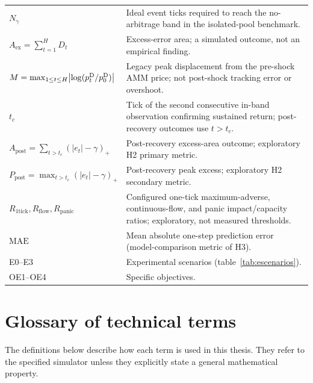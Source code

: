 \begin{center}
\begin{tabularx}{\textwidth}{@{}l X@{}}
$N_\gamma$ & Ideal event ticks required to reach the no-arbitrage band in the isolated-pool benchmark. \\
$A_{\mathrm{ex}} = \sum_{t=1}^{H} D_t$ & Excess-error area; a simulated outcome, not an empirical finding. \\
$M = \max_{1\le t\le H}\bigl|\log(p^{\mathrm{D}}_t/p^{\mathrm{D}}_0)\bigr|$ & Legacy peak displacement from the pre-shock AMM price; not post-shock tracking error or overshoot. \\
$t_c$ & Tick of the second consecutive in-band observation confirming sustained return; post-recovery outcomes use $t>t_c$. \\
$A_{\mathrm{post}}=\sum_{t>t_c}(|e_t|-\gamma)_+$ & Post-recovery excess-area outcome; exploratory H2 primary metric. \\
$P_{\mathrm{post}}=\max_{t>t_c}(|e_t|-\gamma)_+$ & Post-recovery peak excess; exploratory H2 secondary metric. \\
$R_{\mathrm{1tick}},R_{\mathrm{flow}},R_{\mathrm{panic}}$ & Configured one-tick maximum-adverse, continuous-flow, and panic impact/capacity ratios; exploratory, not measured thresholds. \\
$\mathrm{MAE}$ & Mean absolute one-step prediction error (model-comparison metric of H3). \\
E0--E3 & Experimental scenarios (table~\ref{tab:escenarios}). \\
OE1--OE4 & Specific objectives. \\
\bottomrule
\end{tabularx}
\end{center}

\section*{Glossary of technical terms}
{}

\begingroup
\small
\setlength{\parskip}{0.15em}
The definitions below describe how each term is used in this thesis. They refer to
the specified simulator unless they explicitly state a general mathematical property.

